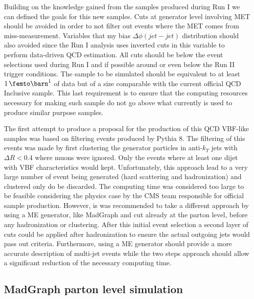 
Building on the knowledge gained from the samples produced during Run I we can defined the goals for this new samples. Cuts at generator level involving \gls{MET} should be avoided in order to not filter out events where the \gls{MET} comes from miss-measurement. Variables that my bias $\Delta\phi(jet-jet)$ distribution should also avoided since the Run I analysis uses inverted cuts in this variable to perform data-driven \gls{QCD} estimation. All cuts should be below the event selections used during Run I and if possible around or even below the Run II trigger conditions. The sample to be simulated should be equivalent to at least $1\,\femto\barn^{1}$ of data but of a size comparable with the current official \gls{QCD} Inclusive sample. This last requirement is to ensure that the computing resources necessary for making such sample do not go above what currently is used to produce similar purpose samples. 

The first attempt to produce a proposal for the production of this QCD VBF-like samples was based on filtering events produced by Pythia 8. The filtering of this events was made by first clustering the generator particles in anti-$k_T$ jets with $\Delta R<0.4$ where muons were ignored. Only the events where at least one dijet with \gls{VBF} characteristics would kept. Unfortunately, this approach lead to a very large number of event being generated (hard scattering and hadronization) and clustered only do be discarded. The computing time was considered too large to be feasible considering the physics case by the \gls{CMS} team responsible for official sample production. However, is was recommended to take a different approach by using a \gls{ME} generator, like MadGraph and cut already at the parton level, before any hadronization or clustering. After this initial event selection a second layer of cuts could be applied after hadronization to ensure the actual outgoing jets would pass out criteria. Furthermore, using a \gls{ME} generator should provide a more accurate description of multi-jet events while the two steps approach should allow a significant reduction of the necessary computing time. 

\subsection{MadGraph parton level simulation}
\label{SUBSECTION:RunIIPreparation_MadGraphPartonLevelSimulation}

